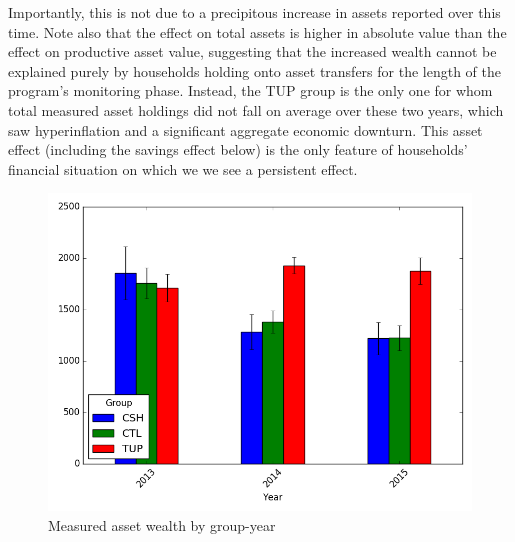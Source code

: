 \documentclass[12pt,article]{article}
\begin{document}
Importantly, this is not due to a precipitous increase in assets reported over this
time. Note also that the effect on total assets is higher in absolute value than the
effect on productive asset value, suggesting that the increased wealth cannot be
explained purely by households holding onto asset transfers for the length of the
program's monitoring phase. Instead, the TUP group is the only one for whom total
measured asset holdings did not fall on average over these two years, which saw
hyperinflation and a significant aggregate economic downturn. This asset effect
(including the savings effect below) is the only feature of households' financial
situation on which we we see a persistent effect.

\begin{figure}[htb]
\centering
\includegraphics[width=.9\linewidth]{../figures/AssetTotal_groupyear.png}
\caption{\label{fig:AssetTotal}Measured asset wealth by group-year}
\end{figure} 
\end{document}
